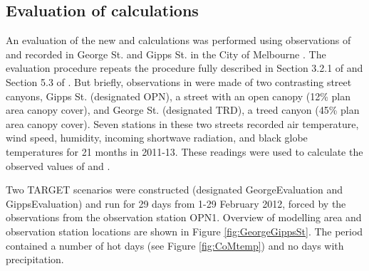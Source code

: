 \documentclass[final,3p,times,authoryear]{elsarticle}
\begin{document}
\subsection{Evaluation of  calculations}\label{sec:methods_eval}

An evaluation of the new  and  calculations was performed using observations of  and  recorded in George St. and Gipps St. in the City of Melbourne \citep{Coutts2015}. The evaluation procedure repeats the procedure fully described in Section 3.2.1 of \cite{Nice2018} and Section 5.3 of \cite{Nice2016}. But briefly, observations in \cite{Coutts2015} were made of two contrasting street canyons, Gipps St. (designated OPN), a street with an open canopy (12\% plan area canopy cover), and George St. (designated TRD), a treed canyon (45\% plan area canopy cover). Seven stations in these two streets recorded air temperature, wind speed, humidity, incoming shortwave radiation, and black globe temperatures for 21 months in 2011-13. These readings were used to calculate the observed values of  and . 


Two TARGET scenarios were constructed (designated GeorgeEvaluation and GippsEvaluation) and run for 29 days from 1-29 February 2012, forced by the observations from the observation station OPN1. Overview of modelling area and observation station locations are shown in Figure \ref{fig:GeorgeGippsSt}. The period contained a number of hot days (see Figure \ref{fig:CoMtemp}) and no days with precipitation.
\end{document}
